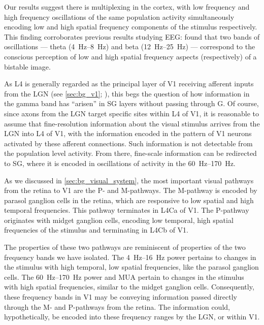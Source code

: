 Our results suggest there is multiplexing in the cortex, with low frequency and high frequency oscillations of the same population activity simultaneously encoding low and high spatial frequency components of the stimulus respectively.
This finding corroborates previous results studying \ac{EEG}: \citet{Smith2006} found that two bands of oscillations --- theta (\SIrange{4}{8}{Hz}) and beta (\SIrange{12}{25}{Hz}) --- correspond to the conscious perception of low and high spatial frequency aspects (respectively) of a bistable image.

As \ac{L4} is generally regarded as the principal layer of \ac{V1} receiving afferent inputs from the \ac{LGN} (see \autoref{sec:bg_v1}; \citealp{Callaway1998,Horton2005,Nassi2009,Harris2013}), this begs the question of how information in the gamma band has ``arisen'' in \ac{SG} layers without passing through \ac{G}.
Of course, since axons from the \ac{LGN} target specific sites within \ac{L4} of \ac{V1}, it is reasonable to assume that fine-resolution information about the visual stimulus arrives from the \ac{LGN} into \ac{L4} of \ac{V1}, with the information encoded in the pattern of \ac{V1} neurons activated by these afferent connections.
Such information is not detectable from the population level activity.
From there, fine-scale information can be redirected to \ac{SG}, where it is encoded in oscillations of activity in the \SIrange{60}{170}{Hz}.

As we discussed in \autoref{sec:bg_visual_system}, the most important visual pathways from the retina to \ac{V1} are the P- and M-pathways.
The M-pathway is encoded by parasol ganglion cells in the retina, which are responsive to low spatial and high temporal frequencies.
This pathway terminates in \ac{L4Ca} of \ac{V1}.
The P-pathway originates with midget ganglion cells, encoding low temporal, high spatial frequencies of the stimulus and terminating in \ac{L4Cb} of \ac{V1}.

The properties of these two pathways are reminiscent of properties of the two frequency bands we have isolated.
The \SIrange{4}{16}{Hz} power pertains to changes in the stimulus with high temporal, low spatial frequencies, like the parasol ganglion cells.
The \SIrange{60}{170}{Hz} power and \ac{MUA} pertain to changes in the stimulus with high spatial frequencies, similar to the midget ganglion cells.
Consequently, these frequency bands in \ac{V1} may be conveying information passed directly through the M- and P-pathways from the retina.
The information could, hypothetically, be encoded into these frequency ranges by the \ac{LGN}, or within \ac{V1}.

